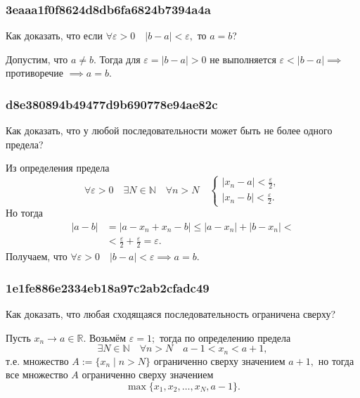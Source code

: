 \documentclass[11pt, a5paper]{article}
\newenvironment{note}[1]{\goodbreak\par\subsubsection{\hfill \color{lightgray}\tiny #1}}{}
\newenvironment{cloze}[2][\ldots]{\begin{leftbar}}{\end{leftbar}}
\begin{document}
    \begin{note}{3eaaa1f0f8624d8db6fa6824b7394a4a}
        Как доказать, что если \( \forall \varepsilon > 0 \quad |b - a| <
        \varepsilon, \) то \( a = b \)?

        \begin{cloze}{1}
            Допустим, что \( a \neq b. \) Тогда для \( \varepsilon = |b - a| > 0
            \) не выполняется \( \varepsilon < |b - a| \implies \) противоречие
            \( \implies a = b. \)
        \end{cloze}
    \end{note}

    \begin{note}{d8e380894b49477d9b690778e94ae82c}
        Как доказать, что у любой последовательности может быть не более одного
        предела?

        \begin{cloze}{1}
            Из определения предела \[
                \forall \varepsilon > 0 \quad \exists N \in \mathbb N \quad \forall n > N \quad
                \begin{cases}
                    |x_n - a| < \frac{\varepsilon}{2}, \\
                    |x_n - b| < \frac{\varepsilon}{2}.
                \end{cases}
            \]
            Но тогда \[
                \begin{aligned}
                    |a - b| &= |a - x_n + x_n - b| \leqslant |a - x_n| + |b - x_n| < \\
                            &< \frac{\varepsilon}{2} +
                            \frac{\varepsilon}{2} = \varepsilon.
                \end{aligned}
            \]
            Получаем, что \(
                \forall \varepsilon > 0 \quad |b - a| <
                \varepsilon \implies a = b.
            \)
        \end{cloze}
    \end{note}

    \begin{note}{1e1fe886e2334eb18a97c2ab2cfadc49}
        Как доказать, что любая сходящаяся последовательность ограничена сверху?

        \begin{cloze}{1}
            Пусть \( x_n \to a \in \mathbb R. \) Возьмём \( \varepsilon = 1; \)
            тогда по определению предела \[
                \exists N \in \mathbb N \quad \forall n > N \quad a -
                1 < x_n < a + 1,
            \] т.е. множество \( A := \{ x_n \mid n > N \} \) ограниченно сверху
            значением \( a + 1, \) но тогда все множество \( A \) ограниченно
            сверху значением \[
                \max \{ x_1, x_2, \ldots, x_N, a - 1 \}.
            \]
        \end{cloze}
    \end{note}
\end{document}

